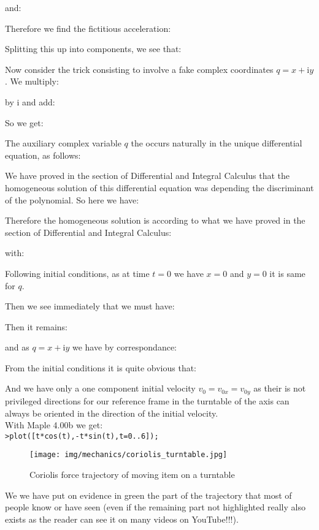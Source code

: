 	\begin{tcolorbox}[colframe=black,colback=white,sharp corners]
	and:
	
	Therefore we find the fictitious acceleration:
	
	Splitting this up into components, we see that:
	
	Now consider the trick consisting to involve a fake complex coordinates $q=x+\mathrm{i}y$. We multiply:
	
	by $\mathrm{i}$ and add:
	
	So we get:
	
	The auxiliary complex variable $q$ the occurs naturally in the unique differential equation, as follows:
	
	We have proved in the section of Differential and Integral Calculus that the homogeneous solution of this differential equation was depending the discriminant of the polynomial. So here we have:
	
	Therefore the homogeneous solution is according to what we have proved in the section of Differential and Integral Calculus:
	
	 with:
	 
	Following initial conditions, as at time $t=0$ we have $x=0$ and $y=0$ it is same for $q$.
	\end{tcolorbox}
	
	\begin{tcolorbox}[colframe=black,colback=white,sharp corners]
	Then we see immediately that we must have:
	
	Then it remains:
	
	 and as $q=x+\mathrm{i}y$ we have by correspondance:
	 
	 From the initial conditions it is quite obvious that:
	 
	 And we have only a one component initial velocity $v_0=v_{0x}=v_{0y}$ as their is not privileged directions for our reference frame in the turntable of the axis can always be oriented in the direction of the initial velocity.\\
	 
	With Maple 4.00b we get:\\
	
	\texttt{>plot([t*cos(t),-t*sin(t),t=0..6]);}\\
	\begin{figure}[H]
		\centering
		\texttt{[image: img/mechanics/coriolis\_turntable.jpg]}
		\caption[]{Coriolis force trajectory of moving item on a turntable}
	\end{figure}
	We we have put on evidence in green the part of the trajectory that most of people know or have seen (even if the remaining part not highlighted really also exists as the reader can see it on many videos on YouTube!!!).
	\end{tcolorbox}
	
